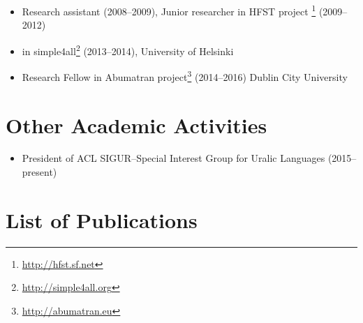 \documentclass[a4paper]{article}
\begin{document}
\begin{itemize}
\item Research assistant (2008–2009), Junior researcher in HFST project \footnote{\url{http://hfst.sf.net}} (2009–2012)
\item in simple4all\footnote{\url{http://simple4all.org}} (2013–2014), University of Helsinki
\item Research Fellow in Abumatran project\footnote{\url{http://abumatran.eu}} (2014–2016) Dublin City University
\end{itemize}

\section*{Other Academic Activities}

\begin{itemize}
\item President of ACL SIGUR–Special Interest Group for Uralic Languages (2015–present)
\end{itemize}

\section*{List of Publications}
\end{document}

